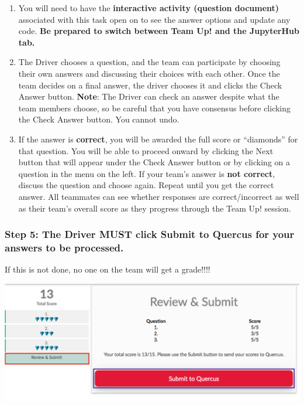 \documentclass[
  openany]{book}
\begin{document}
\begin{enumerate}
\def\labelenumi{\arabic{enumi}.}
\item
  You will need to have the \textbf{interactive activity (question document)} associated with this task open on to see the answer options and update any code. \textbf{Be prepared to switch between Team Up! and the JupyterHub tab.}
\item
  The Driver chooses a question, and the team can participate by choosing their own answers and discussing their choices with each other. Once the team decides on a final answer, the driver chooses it and clicks the Check Answer button. \textbf{Note}: The Driver can check an answer despite what the team members choose, so be careful that you have consensus before clicking the Check Answer button. You cannot undo.
\item
  If the answer is \textbf{correct}, you will be awarded the full score or ``diamonds'' for that question. You will be able to proceed onward by clicking the Next button that will appear under the Check Answer button or by clicking on a question in the menu on the left. If your team's answer is \textbf{not correct}, discuss the question and choose again. Repeat until you get the correct answer. All teammates can see whether responses are correct/incorrect as well as their team's overall score as they progress through the Team Up! session.
\end{enumerate}

\hypertarget{step-5-the-driver-must-click-submit-to-quercus-for-your-answers-to-be-processed.}{%
\subsubsection{Step 5: The Driver MUST click Submit to Quercus for your answers to be processed.}\label{step-5-the-driver-must-click-submit-to-quercus-for-your-answers-to-be-processed.}}

If this is not done, no one on the team will get a grade!!!!

\begin{center}\includegraphics[width=0.7\linewidth]{images/course-tools/submit} \end{center}
\end{document}
